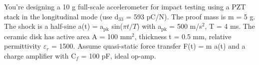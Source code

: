 


You’re designing a 10 g full-scale accelerometer for impact testing using a PZT stack in the longitudinal mode (use d$_{33}$ = 593 pC/N). 
The proof mass is m = 5 g. The shock is a half-sine a(t) = a$_{\text{pk}}$ sin($\pi t / T$) with a$_{\text{pk}}$ = 500 m/s$^2$, T = 4 ms. 
The ceramic disk has active area A = 100 mm$^2$, thickness t = 0.5 mm, relative permittivity $\varepsilon_r$ = 1500. 
Assume quasi-static force transfer F(t) = m a(t) and a charge amplifier with C$_f$ = 100 pF, ideal op-amp.




